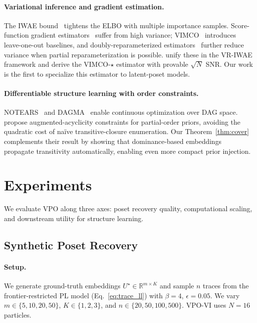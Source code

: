 \documentclass{article}
\theoremstyle{definition}
\theoremstyle{remark}
\newcommand{\R}{\mathbb{R}}
\begin{document}
\paragraph{Variational inference and gradient estimation.}
The IWAE bound~\citep{burda2016iwae} tightens the ELBO with multiple
importance samples.
Score-function gradient estimators~\citep{williams1992reinforce} suffer
from high variance; VIMCO~\citep{mnih2016vimco} introduces leave-one-out
baselines, and doubly-reparameterized
estimators~\citep{tucker2019doubly} further reduce variance when partial
reparameterization is possible.
\citet{daudel2026importance} unify these in the VR-IWAE framework and
derive the VIMCO-$\star$ estimator with provable $\sqrt{N}$ SNR.
Our work is the first to specialize this estimator to latent-poset models.

\paragraph{Differentiable structure learning with order constraints.}
NOTEARS~\citep{zheng2018notears} and DAGMA~\citep{bello2022dagma} enable
continuous optimization over DAG space.
\citet{ban2024differentiable} propose augmented-acyclicity constraints
for partial-order priors, avoiding the quadratic cost of na\"ive
transitive-closure enumeration.
Our Theorem~\ref{thm:cover} complements their result by showing that
dominance-based embeddings propagate transitivity automatically,
enabling even more compact prior injection.

\section{Experiments}
\label{sec:experiments}

We evaluate VPO along three axes: poset recovery quality, computational
scaling, and downstream utility for structure learning.

\subsection{Synthetic Poset Recovery}
\label{sec:exp_synthetic}

\paragraph{Setup.}
We generate ground-truth embeddings
$U^\star\in\R^{m\times K}$ and sample $n$ traces from the
frontier-restricted PL model (Eq.~\ref{eq:trace_ll}) with
$\beta=4$, $\epsilon=0.05$.
We vary $m\in\{5,10,20,50\}$, $K\in\{1,2,3\}$, and
$n\in\{20,50,100,500\}$.
VPO-VI uses $N=16$ particles.
\end{document}
